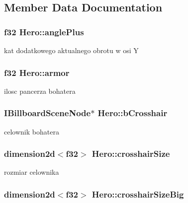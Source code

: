 \subsection{Member Data Documentation}
\hypertarget{class_hero_a17831133c4588d6508d902e93a63cf05}{
\subsubsection[{anglePlus}]{\setlength{\rightskip}{0pt plus 5cm}f32 {\bf Hero::anglePlus}}}
\label{class_hero_a17831133c4588d6508d902e93a63cf05}
kat dodatkowego aktualnego obrotu w osi Y \hypertarget{class_hero_a73de3a70b8e660626bd6ba863b69f593}{
\subsubsection[{armor}]{\setlength{\rightskip}{0pt plus 5cm}f32 {\bf Hero::armor}}}
\label{class_hero_a73de3a70b8e660626bd6ba863b69f593}
ilosc pancerza bohatera \hypertarget{class_hero_ae3dcb584303cef76dab909c103934655}{
\subsubsection[{bCrosshair}]{\setlength{\rightskip}{0pt plus 5cm}IBillboardSceneNode$\ast$ {\bf Hero::bCrosshair}}}
\label{class_hero_ae3dcb584303cef76dab909c103934655}
celownik bohatera \hypertarget{class_hero_a130a9079bc539aa7dda77f9dd52b93cf}{
\subsubsection[{crosshairSize}]{\setlength{\rightskip}{0pt plus 5cm}dimension2d$<$f32$>$ {\bf Hero::crosshairSize}}}
\label{class_hero_a130a9079bc539aa7dda77f9dd52b93cf}
rozmiar celownika \hypertarget{class_hero_a27619bdf7c58a489c832cbb5566a1a83}{
\subsubsection[{crosshairSizeBig}]{\setlength{\rightskip}{0pt plus 5cm}dimension2d$<$f32$>$ {\bf Hero::crosshairSizeBig}}}
\label{class_hero_a27619bdf7c58a489c832cbb5566a1a83}

